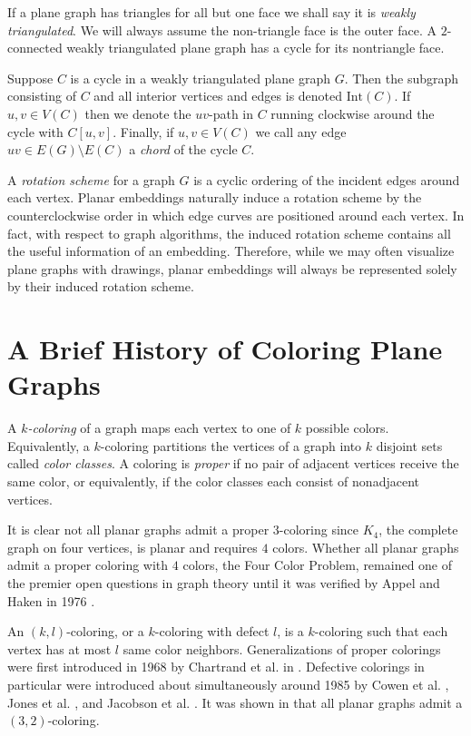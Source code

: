\documentclass[letterpaper, 12pt]{article}
\theoremstyle{definition}
\theoremstyle{definition}
\theoremstyle{thm}
\theoremstyle{definition}
\begin{document}
If a plane graph has triangles for all but one face we shall say it is
\textit{weakly triangulated}. We will always assume the non-triangle face is the
outer face. A $2$-connected weakly triangulated plane graph has a cycle for its
nontriangle face.

Suppose $C$ is a cycle in a weakly
triangulated plane graph $G$. Then the subgraph consisting of $C$ and all interior
vertices and edges is denoted $\text{Int}(C)$. If $u,v \in V(C)$ then we denote
the $uv$-path in $C$ running clockwise around the cycle with $C[u,v]$. Finally,
if $u,v\in V(C)$ we call any edge $uv \in E(G)\setminus E(C)$ a \textit{chord} of
the cycle $C$.

A \textit{rotation scheme} for a graph $G$ is a cyclic ordering of the incident
edges around each vertex. Planar embeddings naturally induce a rotation
scheme by the counterclockwise order in which edge curves are positioned around
each vertex. In fact, with respect to graph algorithms, the induced rotation
scheme contains all the useful information of an embedding. Therefore, while we
may often visualize plane graphs with drawings, planar embeddings will always be
represented solely by their induced rotation scheme.

\section{A Brief History of Coloring Plane Graphs}

A $k$\textit{-coloring} of a graph maps each vertex to one of $k$ possible
colors. Equivalently, a $k$-coloring partitions the vertices of a graph into $k$
disjoint sets called \textit{color classes}. 
A coloring is \textit{proper} if no pair of adjacent vertices receive the same
color, or equivalently, if the color classes each consist of nonadjacent vertices.

It is clear not all planar graphs admit a proper $3$-coloring since $K_4$, the
complete graph on four vertices, is planar and requires $4$ colors. Whether all
planar graphs admit a proper coloring with $4$ colors, the Four Color Problem,
remained one of the premier open questions in graph theory until it was verified
by Appel and Haken in 1976 \cite{appel1, appel2}.

An $(k,l)$-coloring, or a $k$-coloring with defect $l$, is a
$k$-coloring such that each vertex has at most $l$ same color neighbors.
Generalizations of proper colorings were first introduced in 1968 by Chartrand et al. in
\cite{chartrand}. Defective colorings in particular were introduced about
simultaneously around 1985 by Cowen et al. \cite{cowen}, Jones et al. \cite{jones}, and
Jacobson et al. \cite{jacobson}. It was shown in \cite{cowen} that all
planar graphs admit a $(3,2)$-coloring.
\end{document}
